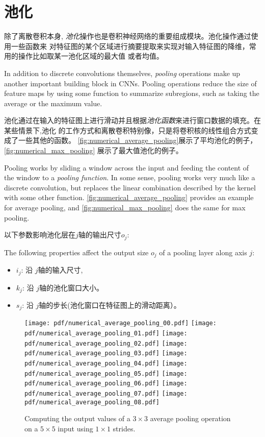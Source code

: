 \documentclass[notitlepage]{report}
\begin{document}
\section{池化}

除了离散卷积本身, {\em 池化\/}操作也是卷积神经网络的重要组成模块。池化操作通过使用一些函数来
对特征图的某个区域进行摘要提取来实现对输入特征图的降维，常用的操作比如取某一池化区域的最大值
或者均值。

In addition to discrete convolutions themselves, {\em pooling\/} operations
make up another important building block in CNNs. Pooling operations reduce
the size of feature maps by using some function to summarize subregions, such
as taking the average or the maximum value.

池化通过在输入的特征图上进行滑动并且根据{\em 池化函数}来进行窗口数据的填充。在某些情景下,池化
的工作方式和离散卷积特别像，只是将卷积核的线性组合方式变成了一些其他的函数。
\autoref{fig:numerical_average_pooling}展示了平均池化的例子，\autoref{fig:numerical_max_pooling}
展示了最大值池化的例子。

Pooling works by sliding a window across the input and feeding the content of
the window to a {\em pooling function}. In some sense, pooling works very much
like a discrete convolution, but replaces the linear combination described by
the kernel with some other function. \autoref{fig:numerical_average_pooling}
provides an example for average pooling, and \autoref{fig:numerical_max_pooling}
does the same for max pooling.

以下参数影响池化层在$j$轴的输出尺寸$o_j$:

The following properties affect the output size $o_j$ of a pooling layer
along axis $j$:

\begin{itemize}
    \item $i_j$: 沿 $j$轴的输入尺寸,
    \item $k_j$: 沿 $j$轴的池化窗口大小。
    \item $s_j$: 沿 $j$轴的步长(池化窗口在特征图上的滑动距离）。
\end{itemize}

\begin{figure}[p]
    \centering
    \texttt{[image: pdf/numerical\_average\_pooling\_00.pdf]}
    \texttt{[image: pdf/numerical\_average\_pooling\_01.pdf]}
    \texttt{[image: pdf/numerical\_average\_pooling\_02.pdf]}
    \texttt{[image: pdf/numerical\_average\_pooling\_03.pdf]}
    \texttt{[image: pdf/numerical\_average\_pooling\_04.pdf]}
    \texttt{[image: pdf/numerical\_average\_pooling\_05.pdf]}
    \texttt{[image: pdf/numerical\_average\_pooling\_06.pdf]}
    \texttt{[image: pdf/numerical\_average\_pooling\_07.pdf]}
    \texttt{[image: pdf/numerical\_average\_pooling\_08.pdf]}
    \caption{\label{fig:numerical_average_pooling} Computing the output values
        of a $3 \times 3$ average pooling operation on a $5 \times 5$ input
        using $1 \times 1$ strides.}
\end{figure}
\end{document}
